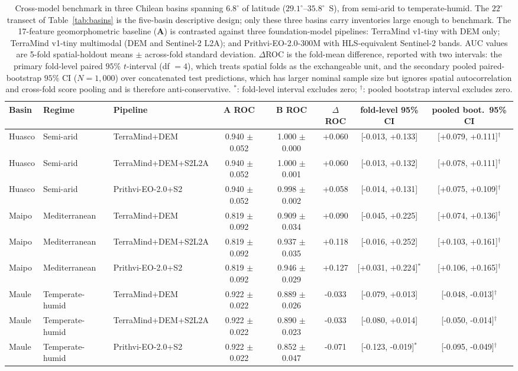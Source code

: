 \begin{table}
\centering
\caption{Cross-model benchmark in three Chilean basins spanning $6.8^{\circ}$ of latitude ($29.1^{\circ}$--$35.8^{\circ}$~S), from semi-arid to temperate-humid. The $22^{\circ}$ transect of Table~\ref{tab:basins} is the five-basin descriptive design; only these three basins carry inventories large enough to benchmark. The 17-feature geomorphometric baseline (\textbf{A}) is contrasted against three foundation-model pipelines: TerraMind v1-tiny with DEM only; TerraMind v1-tiny multimodal (DEM and Sentinel-2 L2A); and Prithvi-EO-2.0-300M with HLS-equivalent Sentinel-2 bands. AUC values are 5-fold spatial-holdout means $\pm$ across-fold standard deviation. $\Delta$ROC is the fold-mean difference, reported with two intervals: the primary fold-level paired $95\%$ $t$-interval (df $= 4$), which treats spatial folds as the exchangeable unit, and the secondary pooled paired-bootstrap $95\%$ CI ($N=1{,}000$) over concatenated test predictions, which has larger nominal sample size but ignores spatial autocorrelation and cross-fold score pooling and is therefore anti-conservative. $^{*}$: fold-level interval excludes zero; $^{\dagger}$: pooled bootstrap interval excludes zero.}
\label{tab:benchmark}
\scriptsize
\setlength{\tabcolsep}{3pt}
\begin{tabular}{lllccccc}
\toprule
Basin & Regime & Pipeline & A ROC & B ROC & $\Delta$ROC & fold-level 95\% CI & pooled boot.\ 95\% CI \\
\midrule
Huasco & Semi-arid & TerraMind+DEM & 0.940 $\pm$ 0.052 & 1.000 $\pm$ 0.000 & +0.060 & [-0.013, +0.133] & [+0.079, +0.111]$^{\dagger}$ \\
Huasco & Semi-arid & TerraMind+DEM+S2L2A & 0.940 $\pm$ 0.052 & 1.000 $\pm$ 0.001 & +0.060 & [-0.013, +0.132] & [+0.078, +0.111]$^{\dagger}$ \\
Huasco & Semi-arid & Prithvi-EO-2.0+S2 & 0.940 $\pm$ 0.052 & 0.998 $\pm$ 0.002 & +0.058 & [-0.014, +0.131] & [+0.075, +0.109]$^{\dagger}$ \\
\midrule
Maipo & Mediterranean & TerraMind+DEM & 0.819 $\pm$ 0.092 & 0.909 $\pm$ 0.034 & +0.090 & [-0.045, +0.225] & [+0.074, +0.136]$^{\dagger}$ \\
Maipo & Mediterranean & TerraMind+DEM+S2L2A & 0.819 $\pm$ 0.092 & 0.937 $\pm$ 0.035 & +0.118 & [-0.016, +0.252] & [+0.103, +0.161]$^{\dagger}$ \\
Maipo & Mediterranean & Prithvi-EO-2.0+S2 & 0.819 $\pm$ 0.092 & 0.946 $\pm$ 0.029 & +0.127 & [+0.031, +0.224]$^{*}$ & [+0.106, +0.165]$^{\dagger}$ \\
\midrule
Maule & Temperate-humid & TerraMind+DEM & 0.922 $\pm$ 0.022 & 0.889 $\pm$ 0.026 & -0.033 & [-0.079, +0.013] & [-0.048, -0.013]$^{\dagger}$ \\
Maule & Temperate-humid & TerraMind+DEM+S2L2A & 0.922 $\pm$ 0.022 & 0.890 $\pm$ 0.023 & -0.033 & [-0.080, +0.014] & [-0.050, -0.014]$^{\dagger}$ \\
Maule & Temperate-humid & Prithvi-EO-2.0+S2 & 0.922 $\pm$ 0.022 & 0.852 $\pm$ 0.047 & -0.071 & [-0.123, -0.019]$^{*}$ & [-0.095, -0.049]$^{\dagger}$ \\
\bottomrule
\end{tabular}
\end{table}
